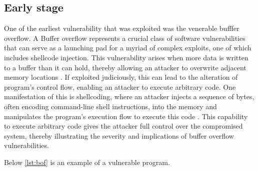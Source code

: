 \documentclass{article}
\begin{document}
\subsection{Early stage}
\begin{comment}
  shellcoding
  reference smashing the stack for fun and profit
\end{comment}
One of the earliest vulnerability that was exploited was the venerable bufffer
overflow. A Buffer overflow represents a crucial class of software
vulnerabilities that can serve as a launching pad for a myriad of complex
exploits, one of which includes shellcode injection. This vulnerability arises
when more data is written to a buffer than it can hold, thereby allowing an
attacker to overwrite adjacent memory locations \cite{seacord2013}. If exploited
judiciously, this can lead to the alteration of program's control flow, enabling
an attacker to execute arbitrary code. One manifestation of this is shellcoding,
where an attacker injects a sequence of bytes, often encoding command-line shell
instructions, into the memory and manipulates the program's execution flow to
execute this code \cite{one1996smashing}. This capability to execute arbitrary
code gives the attacker full control over the compromised system, thereby
illustrating the severity and implications of buffer overflow vulnerabilities.

Below \ref{lst:bof} is an example of a vulnerable program.
\end{document}

